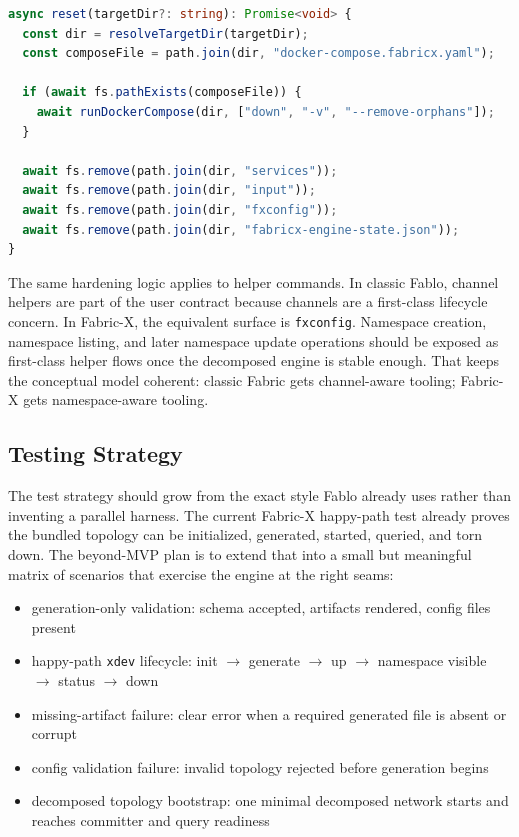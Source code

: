 \begin{tcolorbox}[colback=gray!5!white, colframe=gray!50!black,
  title=Planned Fabric-X reset flow,
  fonttitle=\bfseries, arc=4pt]
\begin{lstlisting}[language=typescript, basicstyle=\ttfamily\small]
async reset(targetDir?: string): Promise<void> {
  const dir = resolveTargetDir(targetDir);
  const composeFile = path.join(dir, "docker-compose.fabricx.yaml");

  if (await fs.pathExists(composeFile)) {
    await runDockerCompose(dir, ["down", "-v", "--remove-orphans"]);
  }

  await fs.remove(path.join(dir, "services"));
  await fs.remove(path.join(dir, "input"));
  await fs.remove(path.join(dir, "fxconfig"));
  await fs.remove(path.join(dir, "fabricx-engine-state.json"));
}
\end{lstlisting}
\end{tcolorbox}

The same hardening logic applies to helper commands. In classic Fablo, channel helpers are part of the user contract because channels are a first-class lifecycle concern. In Fabric-X, the equivalent surface is \texttt{fxconfig}. Namespace creation, namespace listing, and later namespace update operations should be exposed as first-class helper flows once the decomposed engine is stable enough. That keeps the conceptual model coherent: classic Fabric gets channel-aware tooling; Fabric-X gets namespace-aware tooling.

\subsection{Testing Strategy}

The test strategy should grow from the exact style Fablo already uses rather than inventing a parallel harness. The current Fabric-X happy-path test already proves the bundled topology can be initialized, generated, started, queried, and torn down. The beyond-MVP plan is to extend that into a small but meaningful matrix of scenarios that exercise the engine at the right seams:
\begin{itemize}[leftmargin=*]
  \item generation-only validation: schema accepted, artifacts rendered, config files present
  \item happy-path \texttt{xdev} lifecycle: init $\rightarrow$ generate $\rightarrow$ up $\rightarrow$ namespace visible $\rightarrow$ status $\rightarrow$ down
  \item missing-artifact failure: clear error when a required generated file is absent or corrupt
  \item config validation failure: invalid topology rejected before generation begins
  \item decomposed topology bootstrap: one minimal decomposed network starts and reaches committer and query readiness
\end{itemize}

